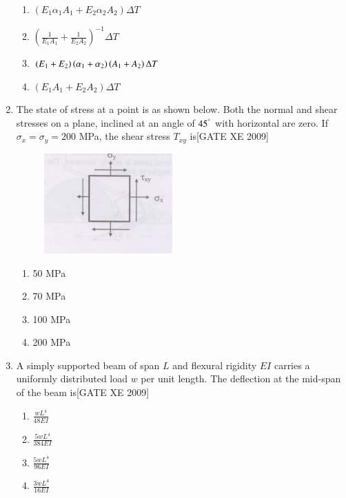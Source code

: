 \documentclass[journal,12pt,onecolumn]{IEEEtran}
\theoremstyle{remark}
\begin{document}
\begin{enumerate}
\begin{enumerate}
    \item $(E_1 \alpha_1 A_1 + E_2 \alpha_2 A_2) \Delta T$
    \item $\left(\frac{1}{E_1 A_1} + \frac{1}{E_2 A_2} \right)^{-1} \Delta T$
    \item $(E_1 + E_2)\left(\alpha_1 + \alpha_2\right)\left(A_1 + A_2\right) \Delta T$
    \item $(E_1 A_1 + E_2 A_2) \Delta T$
 
\end{enumerate}

\item The state of stress at a point is as shown below. Both the normal and shear stresses on a plane, inclined at an angle of $45^\degree$ with horizontal are zero. If $\sigma_x = \sigma_y = 200$ MPa, the shear stress $T_{xy}$ is\hfill[GATE XE 2009]\\
\begin{figure}[h]
    \centering
    \includegraphics[width=0.5\columnwidth]{figs/fig9.png}
\end{figure}
   

\begin{multicols}{2}
\begin{enumerate}
    \item 50 MPa
    \item 70 MPa
    \item 100 MPa
    \item 200 MPa
\end{enumerate}
\end{multicols}



\bigskip
\item A simply supported beam of span $L$ and flexural rigidity $EI$ carries a uniformly distributed load $w$ per unit length. The deflection at the mid-span of the beam is\hfill[GATE XE 2009]\\
\begin{multicols}{2}
\begin{enumerate}
    \item $\frac{wL^4}{48EI}$
    \item $\frac{5wL^4}{384EI}$
    \item $\frac{5wL^4}{96EI}$
    \item $\frac{3wL^4}{16EI}$
\end{enumerate}
\end{multicols}




\end{enumerate}
\end{document}

